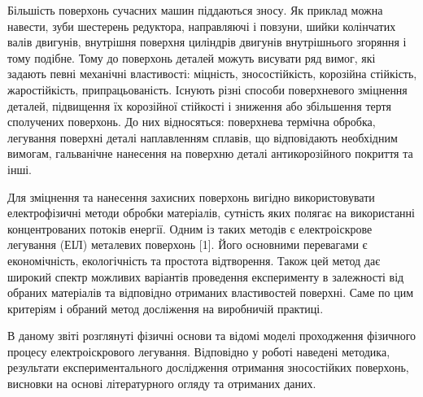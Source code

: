 
Більшість поверхонь сучасних машин піддаються зносу. Як приклад можна навести, зуби шестерень редуктора, направляючі і повзуни, шийки колінчатих валів двигунів, внутрішня поверхня циліндрів двигунів внутрішнього згоряння і тому подібне. Тому до поверхонь деталей можуть висувати ряд вимог, які задають певні механічні властивості: міцність, зносостійкість, корозійна стійкість, жаростійкість, припрацьованість. Існують різні способи поверхневого зміцнення деталей, підвищення їх корозійної стійкості і зниження або збільшення тертя сполучених поверхонь. До них відносяться: поверхнева термічна обробка, легування поверхні деталі наплавленням сплавів, що відповідають необхідним вимогам, гальванічне нанесення на поверхню деталі антикорозійного покриття та інші.

Для зміцнення та нанесення захисних поверхонь вигідно використовувати електрофізичні методи обробки матеріалів, сутність яких полягає на використанні концентрованих потоків енергії. Одним із таких методів є електроіскрове легування (ЕІЛ) металевих поверхонь [1]. Його основними перевагами є економічність, екологічність та простота відтворення. Також цей метод дає широкий спектр можливих варіантів проведення експерименту в залежності від обраних матеріалів та відповідно отриманих властивостей поверхні. Саме по цим критеріям і обраний метод досліження на виробничій практиці.

В даному звіті розглянуті фізичні основи та відомі моделі проходження фізичного процесу електроіскрового легування. Відповідно у роботі наведені методика, результати експериментального дослідження отримання зносостійких поверхонь, висновки на основі літературного огляду та отриманих даних.
